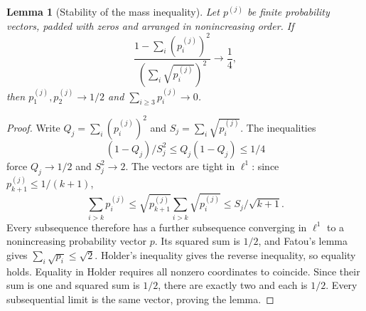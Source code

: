 \documentclass[11pt]{amsart}
\numberwithin{equation}{section}
\newtheorem{lemma}[theorem]{Lemma}
\theoremstyle{definition}
\theoremstyle{remark}
\begin{document}
\begin{lemma}[Stability of the mass inequality]\label{lem:mass-stability}
Let $p^{(j)}$ be finite probability vectors, padded with zeros and arranged in nonincreasing order. If
\[
\frac{1-\sum_i(p_i^{(j)})^2}{(\sum_i\sqrt{p_i^{(j)}})^2}\longrightarrow\frac14,
\]
then $p_1^{(j)},p_2^{(j)}\to1/2$ and $\sum_{i\ge3}p_i^{(j)}\to0$.
\end{lemma}
\begin{proof}
Write $Q_j=\sum_i(p_i^{(j)})^2$ and $S_j=\sum_i\sqrt{p_i^{(j)}}$. The inequalities
\[
(1-Q_j)/S_j^2\le Q_j(1-Q_j)\le1/4
\]
force $Q_j\to1/2$ and $S_j^2\to2$. The vectors are tight in $\ell^1$: since $p_{k+1}^{(j)}\le1/(k+1)$,
\[
\sum_{i>k}p_i^{(j)}
\le\sqrt{p_{k+1}^{(j)}}\sum_{i>k}\sqrt{p_i^{(j)}}
\le S_j/\sqrt{k+1}.
\]
Every subsequence therefore has a further subsequence converging in $\ell^1$ to a nonincreasing probability vector $p$. Its squared sum is $1/2$, and Fatou's lemma gives $\sum_i\sqrt{p_i}\le\sqrt2$. Holder's inequality gives the reverse inequality, so equality holds. Equality in Holder requires all nonzero coordinates to coincide. Since their sum is one and squared sum is $1/2$, there are exactly two and each is $1/2$. Every subsequential limit is the same vector, proving the lemma.
\end{proof}
\end{document}
